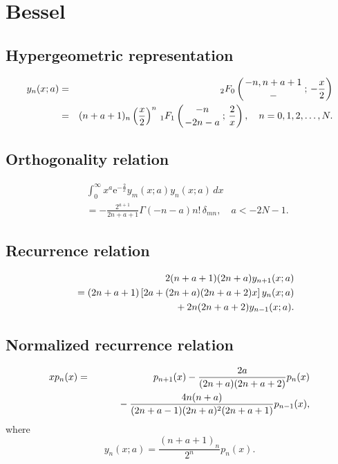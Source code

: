 \documentclass[envcountchap,graybox]{svmono}
\newcommand{\hyp}[5]{\mbox{}_{#1}{F}_{#2}
\left(\genfrac{}{}{0pt}{}{#3}{#4}\,;\,#5\right)}
\newcommand{\mathindent}{\hspace{7.5mm}}
\newcommand{\e}{\textrm{e}}
\renewcommand{\Gamma}{\varGamma}
\begin{document}
\section{Bessel}

\par\setcounter{equation}{0}

\subsection*{Hypergeometric representation}
\begin{eqnarray}
\label{DefBessel}
y_n(x;a)&=&\hyp{2}{0}{-n,n+a+1}{-}{-\frac{x}{2}}\\
&=&(n+a+1)_n\left(\frac{x}{2}\right)^n\,\hyp{1}{1}{-n}{-2n-a}{\frac{2}{x}},
\quad n=0,1,2,\ldots,N.\nonumber
\end{eqnarray}

\subsection*{Orthogonality relation}
\begin{eqnarray}
\label{OrtBessel}
& &\int_0^{\infty}x^a\e^{-\frac{2}{x}}y_m(x;a)y_n(x;a)\,dx\nonumber\\
& &=-\frac{2^{a+1}}{2n+a+1}\Gamma(-n-a)n!\,\delta_{mn},\quad a<-2N-1.
\end{eqnarray}

\subsection*{Recurrence relation}
\begin{eqnarray}
\label{RecBessel}
& &2(n+a+1)(2n+a)y_{n+1}(x;a)\nonumber\\
& &{}=(2n+a+1)\left[2a+(2n+a)(2n+a+2)x\right]y_n(x;a)\nonumber\\
& &{}\mathindent{}+2n(2n+a+2)y_{n-1}(x;a).
\end{eqnarray}

\subsection*{Normalized recurrence relation}
\begin{eqnarray}
\label{NormRecBessel}
xp_n(x)&=&p_{n+1}(x)-\frac{2a}{(2n+a)(2n+a+2)}p_n(x)\nonumber\\
& &{}\mathindent{}-\frac{4n(n+a)}{(2n+a-1)(2n+a)^2(2n+a+1)}p_{n-1}(x),
\end{eqnarray}
where
$$y_n(x;a)=\frac{(n+a+1)_n}{2^n}p_n(x).$$
\end{document}
